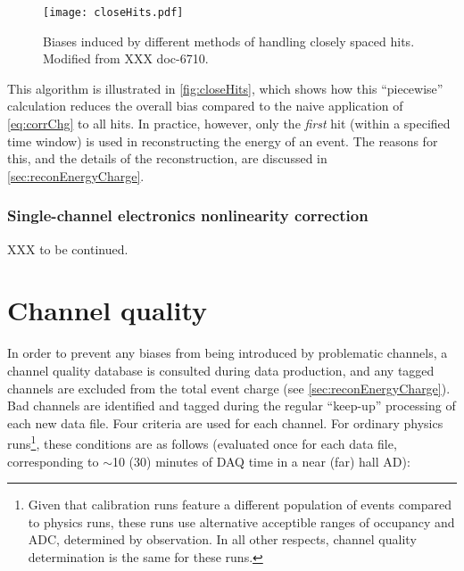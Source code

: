 \documentclass[../thesis.tex]{subfiles}
\begin{document}
\begin{figure}[ht]
  \texttt{[image: closeHits.pdf]}
  \caption{Biases induced by different methods of handling closely spaced
    hits. Modified from XXX doc-6710.}
  \label{fig:closeHits}
\end{figure}

This algorithm is illustrated in \autoref{fig:closeHits}, which shows how this
``piecewise'' calculation reduces the overall bias compared to the naive
application of \eqref{eq:corrChg} to all hits. In practice, however, only the
\emph{first} hit (within a specified time window) is used in reconstructing the
energy of an event. The reasons for this, and the details of the reconstruction,
are discussed in \autoref{sec:reconEnergyCharge}.

\subsubsection{Single-channel electronics nonlinearity correction}
\label{sec:calibSCNL}

XXX to be continued.

\section{Channel quality}
\label{sec:calibCQ}

In order to prevent any biases from being introduced by problematic channels, a
channel quality database is consulted during data production, and any tagged
channels are excluded from the total event charge (see
\autoref{sec:reconEnergyCharge}). Bad channels are identified and tagged during
the regular ``keep-up'' processing of each new data file. Four criteria are used
for each channel. For ordinary physics runs\footnote{Given that calibration runs
  feature a different population of events compared to physics runs, these runs
  use alternative acceptible ranges of occupancy and ADC, determined by
  observation. In all other respects, channel quality determination is the same
  for these runs.}, these conditions are as follows (evaluated once for each
data file, corresponding to $\sim$10 (30) minutes of DAQ time in a near (far)
hall AD):
\end{document}
